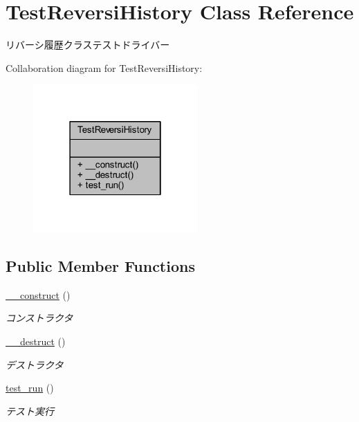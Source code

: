 \hypertarget{class_test_reversi_history}{}\section{Test\+Reversi\+History Class Reference}
\label{class_test_reversi_history}


リバーシ履歴クラステストドライバー  




Collaboration diagram for Test\+Reversi\+History\+:\nopagebreak
\begin{figure}[H]
\begin{center}
\leavevmode
\includegraphics[width=178pt]{class_test_reversi_history__coll__graph}
\end{center}
\end{figure}
\subsection*{Public Member Functions}
\begin{DoxyCompactItemize}
\item 
\hyperlink{class_test_reversi_history_a095c5d389db211932136b53f25f39685}{\+\_\+\+\_\+construct} ()
\begin{DoxyCompactList}\small\item\em コンストラクタ \end{DoxyCompactList}\item 
\hyperlink{class_test_reversi_history_a421831a265621325e1fdd19aace0c758}{\+\_\+\+\_\+destruct} ()
\begin{DoxyCompactList}\small\item\em デストラクタ \end{DoxyCompactList}\item 
\hyperlink{class_test_reversi_history_a9b029832cfdf19c0ef36b1f5ef7b7735}{test\+\_\+run} ()
\begin{DoxyCompactList}\small\item\em テスト実行 \end{DoxyCompactList}\end{DoxyCompactItemize}


